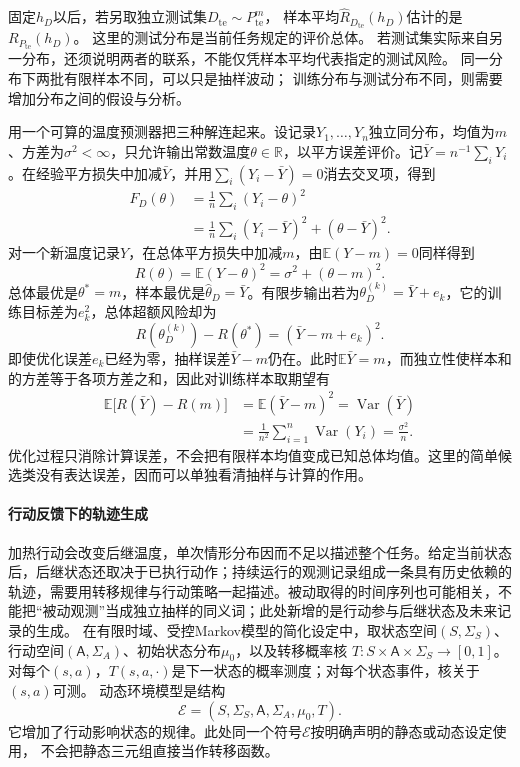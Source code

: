 固定$h_D$以后，若另取独立测试集$D_{\mathrm{te}}\sim P_{\mathrm{te}}^m$，
样本平均$\widehat R_{D_{\mathrm{te}}}(h_D)$估计的是$R_{P_{\mathrm{te}}}(h_D)$。
这里的测试分布是当前任务规定的评价总体。
若测试集实际来自另一分布，还须说明两者的联系，不能仅凭样本平均代表指定的测试风险。
同一分布下两批有限样本不同，可以只是抽样波动；
训练分布与测试分布不同，则需要增加分布之间的假设与分析。

\FloatBarrier
用一个可算的温度预测器把三种解连起来。设记录$Y_1,\ldots,Y_n$独立同分布，均值为$m$、方差为$\sigma^2<\infty$，只允许输出常数温度$\theta\in\mathbb R$，以平方误差评价。记$\bar Y=n^{-1}\sum_iY_i$。在经验平方损失中加减$\bar Y$，并用$\sum_i(Y_i-\bar Y)=0$消去交叉项，得到
\[
 \begin{aligned}
 F_D(\theta)
   &=\frac1n\sum_i(Y_i-\theta)^2\\
   &=\frac1n\sum_i(Y_i-\bar Y)^2+(\theta-\bar Y)^2.
 \end{aligned}
\]
对一个新温度记录$Y$，在总体平方损失中加减$m$，由$\mathbb E(Y-m)=0$同样得到
\[
 R(\theta)=\mathbb E(Y-\theta)^2=\sigma^2+(\theta-m)^2.
\]
总体最优是$\theta^*=m$，样本最优是$\widehat\theta_D=\bar Y$。有限步输出若为$\theta_D^{(k)}=\bar Y+e_k$，它的训练目标差为$e_k^2$，总体超额风险却为
\[
 R(\theta_D^{(k)})-R(\theta^*)=(\bar Y-m+e_k)^2.
\]
即使优化误差$e_k$已经为零，抽样误差$\bar Y-m$仍在。此时$\mathbb E\bar Y=m$，而独立性使样本和的方差等于各项方差之和，因此对训练样本取期望有
\[
 \begin{aligned}
 \mathbb E\bigl[R(\bar Y)-R(m)\bigr]
   &=\mathbb E(\bar Y-m)^2
     =\operatorname{Var}(\bar Y)\\
   &=\frac1{n^2}\sum_{i=1}^n\operatorname{Var}(Y_i)
     =\frac{\sigma^2}{n}.
 \end{aligned}
\]
优化过程只消除计算误差，不会把有限样本均值变成已知总体均值。这里的简单候选类没有表达误差，因而可以单独看清抽样与计算的作用。

\paragraph{行动反馈下的轨迹生成}
\label{sec:future-interactive-learning-process}

加热行动会改变后继温度，单次情形分布因而不足以描述整个任务。给定当前状态后，后继状态还取决于已执行动作；持续运行的观测记录组成一条具有历史依赖的轨迹，需要用转移规律与行动策略一起描述。被动取得的时间序列也可能相关，不能把“被动观测”当成独立抽样的同义词；此处新增的是行动参与后继状态及未来记录的生成。
在有限时域、受控Markov模型的简化设定中，取状态空间$(S,\Sigma_S)$、
行动空间$(\mathsf A,\Sigma_A)$、初始状态分布$\mu_0$，以及转移概率核
$T:S\times\mathsf A\times\Sigma_S\to[0,1]$。
对每个$(s,a)$，$T(s,a,\cdot)$是下一状态的概率测度；对每个状态事件，核关于$(s,a)$可测。
动态环境模型是结构
\[
  \mathcal E=(S,\Sigma_S,\mathsf A,\Sigma_A,\mu_0,T).
\]
它增加了行动影响状态的规律。此处同一个符号$\mathcal E$按明确声明的静态或动态设定使用，
不会把静态三元组直接当作转移函数。

